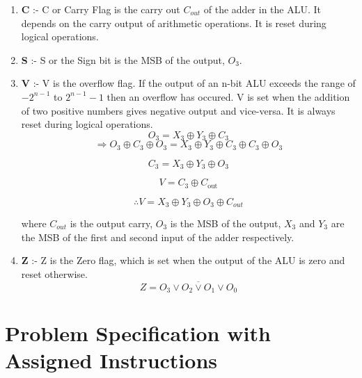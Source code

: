 \documentclass[18pt]{article}
\begin{document}
\begin{enumerate}[label=\alph*)]
    \item \textbf{C} :- C or Carry Flag is the carry out $C_{out}$ of the adder in the ALU. It depends on the carry output of arithmetic operations. It is reset during logical operations.
    \vspace{3mm}
    \item \textbf{S} :- S or the Sign bit is the MSB of the output, $O_{3}$.
    \vspace{3mm}
    
    \item \textbf{V} :- V is the overflow flag. If the output of an n-bit ALU exceeds the range of $-2^{n-1} $ to $ 2^{n-1}-1$ then an overflow has occured. V is set when the addition of two positive numbers gives negative output and vice-versa. It is always reset during logical operations.
    $$O_{3} = X_{3} \oplus  Y_{3} \oplus  C_{3} $$
    $$\Rightarrow O_{3} \oplus C_{3} \oplus O_{3} = X_{3} \oplus  Y_{3} \oplus  C_{3}  \oplus C_{3}  \oplus O_{3} $$
    
    \begin{equation}
    C_{3} = X_{3} \oplus Y_{3} \oplus O_{3}
    \label{eq:equation1}
\end{equation}

\begin{equation}
    V = C_{3} \oplus C_{\text{out}}
    \label{eq:equation2}
\end{equation}
    
    $$\therefore V = X_{3} \oplus  Y_{3} \oplus  O_{3}  \oplus C_{out}  $$

where $C_{out}$ is the output carry, $O_{3}$ is the MSB of the output, $X_{3}$ and $Y_{3}$ are the MSB of the first and second input of the adder respectively.
    
    \vspace{3mm}
    \item \textbf{Z} :- Z is the Zero flag, which is set when the output of the ALU is zero and reset otherwise.$$Z = \overline{
    O_{3} \lor  O_{2} \lor  O_{1} \lor  O_{0} 
    }$$
\end{enumerate}







\normalsize
\newpage
\section{Problem Specification with Assigned Instructions}
\end{document}
